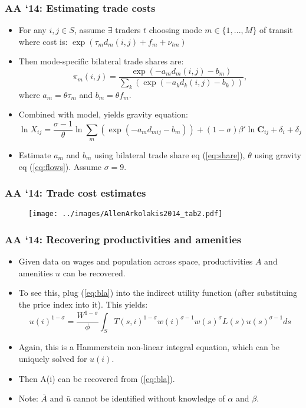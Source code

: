 \documentclass[11pt,notes=hide,aspectratio=169]{beamer}
\begin{document}
\begin{frame}
\frametitle{AA `14: Estimating trade costs}
\begin{itemize}
\item For any $i,j\in S$, assume $\exists$ traders $t$ choosing mode $m\in\{1,...,M\}$ of transit where cost is: $\exp\left(\tau_{m}d_{m}\left(i,j\right)+f_{m}+\nu_{tm}\right)$
 
\item Then mode-specific bilateral trade shares are:
\begin{equation} \label{eq:share}
\pi_{m}\left(i,j\right)=\frac{\exp\left(-a_{m}d_{m}\left(i,j\right)-b_{m}\right)}{\sum_{k}\left(\exp\left(-a_{k}d_{k}\left(i,j\right)-b_{k}\right)\right)},
\end{equation}
  where $a_{m} = \theta\tau_{m}$ and $b_{m} = \theta f_{m}$. 
  
\item Combined with model, yields gravity equation:
\begin{equation} \label{eq:flows}
\ln X_{ij}=\frac{\sigma-1}{\theta}\ln\sum_{m}\left(\exp\left(-a_{m}d_{mij}-b_{m}\right)\right)+\left(1-\sigma\right)\beta'\ln\mathbf{C}_{ij}+\delta_{i}+\delta_{j}
 \end{equation}
\item Estimate $a_{m}$ and $b_{m}$ using bilateral trade share eq (\ref{eq:share}), $\theta$ using gravity eq  (\ref{eq:flows}). Assume $\sigma = 9$.
\end{itemize}
\end{frame}
\begin{frame}
\frametitle{AA `14: Trade cost estimates}
\begin{figure}[htbp] \centering
\texttt{[image: ../images/AllenArkolakis2014\_tab2.pdf]}
\end{figure}
\end{frame}
\begin{frame}
\frametitle{AA `14: Recovering productivities and amenities}
\begin{itemize}
\item Given data on wages and population across space, productivities $A$ and amenities $u$ can be recovered. 
\item To see this, plug (\ref{eq:bla}) into the indirect utility function (after substituing the price index into it). This yields:
\begin{equation*}
u(i)^{1-\sigma} = \frac{W^{1-\sigma}}{\phi} \int_{S} T(s,i)^{1-\sigma} w(i)^{\sigma-1} w(s)^{\sigma}L(s)u(s)^{\sigma-1}ds 
\end{equation*}
\item Again, this is a Hammerstein non-linear integral equation, which can be uniquely solved for $u(i)$. 
\item Then A(i) can be recovered from (\ref{eq:bla}).
\item Note: $\bar{A}$   and $\bar{u}$ cannot be identified without knowledge of $\alpha$ and $\beta$.
\end{itemize}
\end{frame}
\end{document}
